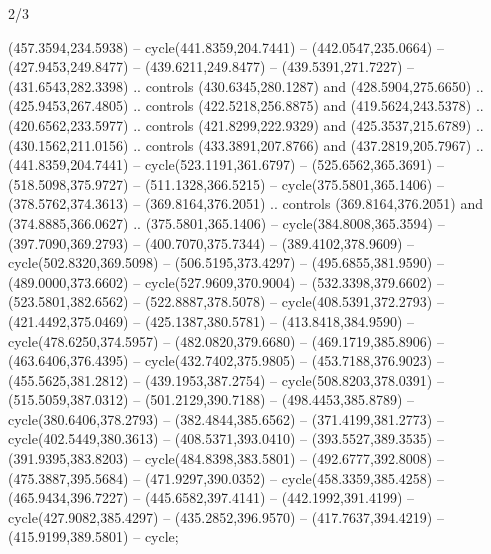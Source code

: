 \begin{flagdescription}{2/3}
\begin{scope}[shift={(\flaglength/2,\flagwidth/2)},scale=\flagwidth/711.3]
\begin{scope}[y=-2.384pt, x=2.384pt,shift={(-224.8,-150)}]
  (457.3594,234.5938) -- cycle(441.8359,204.7441) -- (442.0547,235.0664) --
  (427.9453,249.8477) -- (439.6211,249.8477) -- (439.5391,271.7227) --
  (431.6543,282.3398) .. controls (430.6345,280.1287) and (428.5904,275.6650) ..
  (425.9453,267.4805) .. controls (422.5218,256.8875) and (419.5624,243.5378) ..
  (420.6562,233.5977) .. controls (421.8299,222.9329) and (425.3537,215.6789) ..
  (430.1562,211.0156) .. controls (433.3891,207.8766) and (437.2819,205.7967) ..
  (441.8359,204.7441) -- cycle(523.1191,361.6797) -- (525.6562,365.3691) --
  (518.5098,375.9727) -- (511.1328,366.5215) -- cycle(375.5801,365.1406) --
  (378.5762,374.3613) -- (369.8164,376.2051) .. controls (369.8164,376.2051) and
  (374.8885,366.0627) .. (375.5801,365.1406) -- cycle(384.8008,365.3594) --
  (397.7090,369.2793) -- (400.7070,375.7344) -- (389.4102,378.9609) --
  cycle(502.8320,369.5098) -- (506.5195,373.4297) -- (495.6855,381.9590) --
  (489.0000,373.6602) -- cycle(527.9609,370.9004) -- (532.3398,379.6602) --
  (523.5801,382.6562) -- (522.8887,378.5078) -- cycle(408.5391,372.2793) --
  (421.4492,375.0469) -- (425.1387,380.5781) -- (413.8418,384.9590) --
  cycle(478.6250,374.5957) -- (482.0820,379.6680) -- (469.1719,385.8906) --
  (463.6406,376.4395) -- cycle(432.7402,375.9805) -- (453.7188,376.9023) --
  (455.5625,381.2812) -- (439.1953,387.2754) -- cycle(508.8203,378.0391) --
  (515.5059,387.0312) -- (501.2129,390.7188) -- (498.4453,385.8789) --
  cycle(380.6406,378.2793) -- (382.4844,385.6562) -- (371.4199,381.2773) --
  cycle(402.5449,380.3613) -- (408.5371,393.0410) -- (393.5527,389.3535) --
  (391.9395,383.8203) -- cycle(484.8398,383.5801) -- (492.6777,392.8008) --
  (475.3887,395.5684) -- (471.9297,390.0352) -- cycle(458.3359,385.4258) --
  (465.9434,396.7227) -- (445.6582,397.4141) -- (442.1992,391.4199) --
  cycle(427.9082,385.4297) -- (435.2852,396.9570) -- (417.7637,394.4219) --
  (415.9199,389.5801) -- cycle;
\end{scope}
\end{scope}
\framecode{}
\end{flagdescription}
